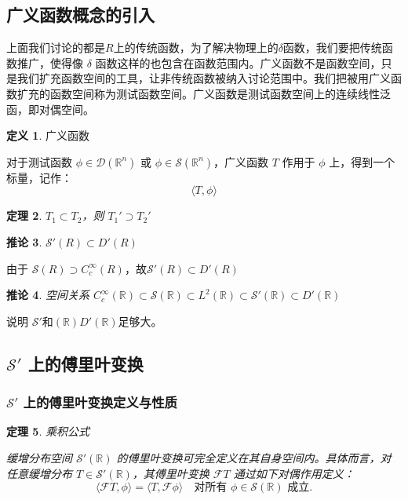 \documentclass[12pt,a4paper]{article}
\newcommand{\R}{\mathbb{R}}                %
\def\R{R}%
\theoremstyle{plain}
\newtheorem{theorem}{定理}[section]
\newtheorem{corollary}[theorem]{推论}  %
\theoremstyle{definition}
\newtheorem{definition}[theorem]{定义}
\theoremstyle{remark}
\begin{document}
\subsection{广义函数概念的引入}
上面我们讨论的都是$R$上的传统函数，为了解决物理上的$\delta$函数，我们要把传统函数推广，使得像 $\delta$ 函数这样的也包含在函数范围内。广义函数不是函数空间，只是我们扩充函数空间的工具，让非传统函数被纳入讨论范围中。我们把被用广义函数扩充的函数空间称为测试函数空间。广义函数是测试函数空间上的连续线性泛函，即对偶空间。



\begin{definition}广义函数
	
对于测试函数 \(\phi \in \mathcal{D}(\mathbb{R}^n)\) 或 \(\phi \in \mathcal{S}(\mathbb{R}^n)\)，广义函数 \(T\) 作用于 \(\phi\) 上，得到一个标量，记作：
\[
\langle T, \phi \rangle
\]

\end{definition}

\begin{theorem}
	\(T_1 \subset T_2\)，则 \(T_1' \supset T_2'\)
\end{theorem}

\begin{corollary}
	$\mathcal{S}'(\R) \subset D'(\R)$
\end{corollary}

由于 $\mathcal{S}(\R) \supset C_c^\infty(\R)$，故$\mathcal{S}'(\R) \subset D'(\R)$

\begin{corollary}空间关系
$C_c^\infty(\mathbb{R}) \subset \mathcal{S}(\mathbb{R}) \subset L^2(\mathbb{R}) \subset \mathcal{S}'(\mathbb{R}) \subset D'(\mathbb{R})$	
\end{corollary}
说明 $\mathcal{S}'$和$(\mathbb{R})D'(\mathbb{R})$足够大。


\subsection{$\mathcal{S}'$  上的傅里叶变换}

\subsubsection{$\mathcal{S}'$  上的傅里叶变换定义与性质}

\begin{theorem}乘积公式
	
	缓增分布空间 $\mathcal{S}'(\mathbb{R})$ 的傅里叶变换可完全定义在其自身空间内。具体而言，对任意缓增分布 $T \in \mathcal{S}'(\mathbb{R})$，其傅里叶变换 $\mathcal{F}T$ 通过如下对偶作用定义：
	\[
	\langle \mathcal{F}T, \phi \rangle = \langle T, \mathcal{F}\phi \rangle \quad \text{对所有 } \phi \in \mathcal{S}(\mathbb{R}) \text{ 成立}.
	\]
\end{theorem}	
	
\end{document}
